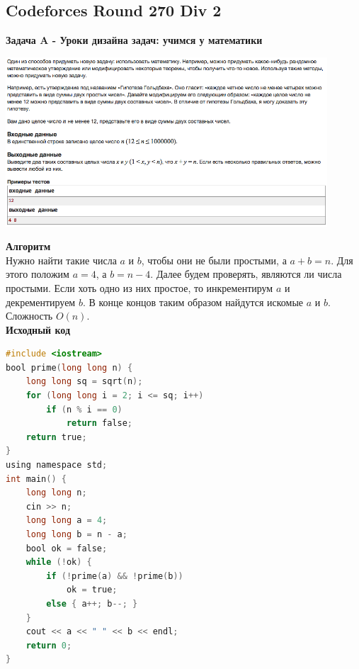 \documentclass[a4paper,12pt]{article}
\begin{document}
%
%

\newpage
\subsection{Codeforces Round 270 Div 2}

\textbf{{\large Задача A - Уроки дизайна задач: учимся у математики}} \\
\begin{center}
\includegraphics[width=0.9\textwidth]{C_270/C_270_A.png}\\ [1cm]
\end{center}
\textbf{{\large Алгоритм}} \\
Нужно найти такие числа $a$ и $b$, чтобы они не были простыми, а $a + b = n$. Для этого положим $a = 4$, а $b = n - 4$. Далее будем проверять, являются ли числа простыми. Если хоть одно из них простое, то инкрементирум $a$ и декрементируем $b$. В конце концов таким образом найдутся искомые $a$ и $b$. Сложность $O(n)$.\\

\textbf{{\large Исходный код}}
\begin{lstlisting}[language=C]
#include <iostream>
bool prime(long long n) {
    long long sq = sqrt(n);
    for (long long i = 2; i <= sq; i++)
        if (n % i == 0)
            return false;
    return true;
}
using namespace std;
int main() {
    long long n;
    cin >> n;   
    long long a = 4;
    long long b = n - a;
    bool ok = false;
    while (!ok) {
        if (!prime(a) && !prime(b))
            ok = true;
        else { a++; b--; }
    } 
    cout << a << " " << b << endl;
    return 0;
}\end{lstlisting}
\end{document}
